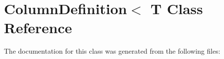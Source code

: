 \hypertarget{class_column_definition_3_01_t}{}\section{Column\+Definition$<$ T Class Reference}
\label{class_column_definition_3_01_t}


The documentation for this class was generated from the following files\+: